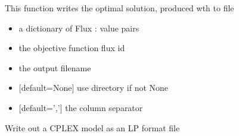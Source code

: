 \documentclass[letterpaper,10pt,english]{sphinxmanual}
\begin{document}
\begin{fulllineitems}
\label{\detokenize{modules_doc:cbmpy.CBCPLEX.cplx_writeLPsolution}}
\pysigstartsignatures
{}
\pysigstopsignatures
\sphinxAtStartPar
This function writes the optimal solution, produced wth  to file
\begin{itemize}
\item {} 
\sphinxAtStartPar
{} a dictionary of Flux : value pairs

\item {} 
\sphinxAtStartPar
{} the objective function flux id

\item {} 
\sphinxAtStartPar
{} the output filename

\item {} 
\sphinxAtStartPar
{} {[}default=None{]} use directory if not None

\item {} 
\sphinxAtStartPar
{} {[}default=’,’{]} the column separator

\end{itemize}

\end{fulllineitems}


\begin{fulllineitems}
\label{\detokenize{modules_doc:cbmpy.CBCPLEX.cplx_writeLPtoLPTfile}}
\pysigstartsignatures
{}
\pysigstopsignatures
\sphinxAtStartPar
Write out a CPLEX model as an LP format file

\end{fulllineitems}
\end{document}
